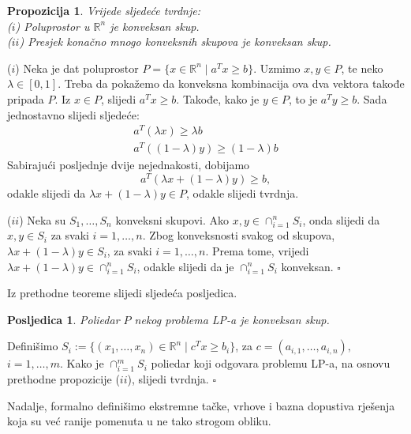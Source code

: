 \documentclass[a4paper, utf8, 11pt, colorlinks]{book}
\newtheorem{prop}{Propozicija}
\newtheorem{poslje}{Posljedica}
\newenvironment{proof}{{Dokaz:}}{\hfill$\square$}
\begin{document}
\begin{prop}Vrijede sljedeće tvrdnje: \\
  ($i$)  Poluprostor u $\mathbb{R}^n$ je konveksan skup.  \\
  ($ii$) Presjek konačno mnogo konveksnih skupova je konveksan skup. 
\end{prop}

\begin{proof}
  ($i$) Neka je dat poluprostor $P = \{ x \in \mathbb{R}^n \mid a^T x \geq b \}$. Uzmimo $x, y \in P$, te neko $\lambda \in [0, 1]$. Treba da pokažemo da konveksna kombinacija ova dva vektora takođe pripada $P$. Iz $x \in P$, slijedi  $a^T x \geq b$. Takođe, kako je $y \in P$, to je  $a^T y \geq b$. 
  Sada jednostavno slijedi sljedeće:
  \begin{align}
      a^T (\lambda x) \geq \lambda b \\
      a^T ((1-\lambda) y) \geq (1-\lambda) b 
  \end{align}
  Sabirajući posljednje dvije nejednakosti, dobijamo 
  \begin{equation}
      a^T( \lambda x + (1 - \lambda) y ) \geq b,
  \end{equation}
  odakle slijedi da $\lambda x + (1-\lambda) y \in P$, odakle slijedi tvrdnja. 
  
  ($ii$) Neka su $S_1,\ldots, S_n$ konveksni skupovi. Ako $x,y \in \cap_{i=1}^n S_i$, onda slijedi da $x,y \in S_i$ za svaki $i=1,\ldots,n$. Zbog konveksnosti svakog od skupova,  
  $\lambda x + (1 - \lambda) y \in S_i$, za svaki $i=1,\ldots,n$. Prema tome, vrijedi $ \lambda x + (1-\lambda) y \in \cap_{i=1}^n S_i$, odakle slijedi da je $\cap_{i=1}^n S_i$ konveksan. 
\end{proof}

Iz prethodne teoreme slijedi sljedeća posljedica.

\begin{poslje}
Poliedar $P$ nekog problema LP-a je konveksan skup.	
\end{poslje}
 
\begin{proof}
  Definišimo $S_i:= \{ (x_1,\ldots, x_n) \in \mathbb{R}^n \mid c^T x \geq b_i \}$, za  $c = (a_{i,1}, \ldots, a_{i, n}),$  $ i=1,\ldots, m$. Kako je $\cap_{i=1}^m S_i$ poliedar koji odgovara problemu LP-a, na osnovu prethodne propozicije ($ii$), slijedi tvrdnja. 
\end{proof}



Nadalje, formalno definišimo ekstremne tačke, vrhove i bazna dopustiva rješenja koja su već ranije pomenuta u ne tako strogom obliku. 
\end{document}
